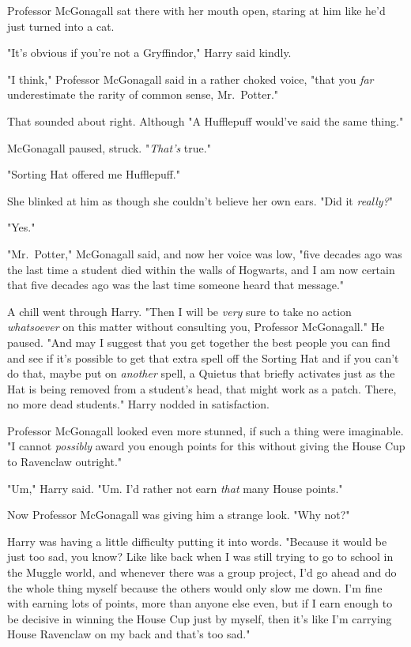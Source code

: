 Professor McGonagall sat there with her mouth open, staring at him like he'd
just turned into a cat.

"It's obvious if you're not a Gryffindor," Harry said kindly.

"I think," Professor McGonagall said in a rather choked voice, "that you
\emph{far} underestimate the rarity of common sense, Mr.~Potter."

That sounded about right. Although{\el} "A Hufflepuff would've said the same
thing."

McGonagall paused, struck. "\emph{That's} true."

"Sorting Hat offered me Hufflepuff."

She blinked at him as though she couldn't believe her own ears. "Did it
\emph{really?}"

"Yes."

"Mr.~Potter," McGonagall said, and now her voice was low, "five decades ago was
the last time a student died within the walls of Hogwarts, and I am now certain
that five decades ago was the last time someone heard that message."

A chill went through Harry. "Then I will be \emph{very} sure to take no action
\emph{whatsoever} on this matter without consulting you, Professor McGonagall."
He paused. "And may I suggest that you get together the best people you can
find and see if it's possible to get that extra spell off the Sorting
Hat{\el} and if you can't do that, maybe put on \emph{another} spell, a
Quietus that briefly activates just as the Hat is being removed from a
student's head, that might work as a patch. There, no more dead students."
Harry nodded in satisfaction.

Professor McGonagall looked even more stunned, if such a thing were imaginable.
"I cannot \emph{possibly} award you enough points for this without giving the
House Cup to Ravenclaw outright."

"Um," Harry said. "Um. I'd rather not earn \emph{that} many House points."

Now Professor McGonagall was giving him a strange look. "Why not?"

Harry was having a little difficulty putting it into words. "Because it would
be just too sad, you know? Like{\el} like back when I was still trying to go
to school in the Muggle world, and whenever there was a group project, I'd go
ahead and do the whole thing myself because the others would only slow me down.
I'm fine with earning lots of points, more than anyone else even, but if I earn
enough to be decisive in winning the House Cup just by myself, then it's like
I'm carrying House Ravenclaw on my back and that's too sad."

